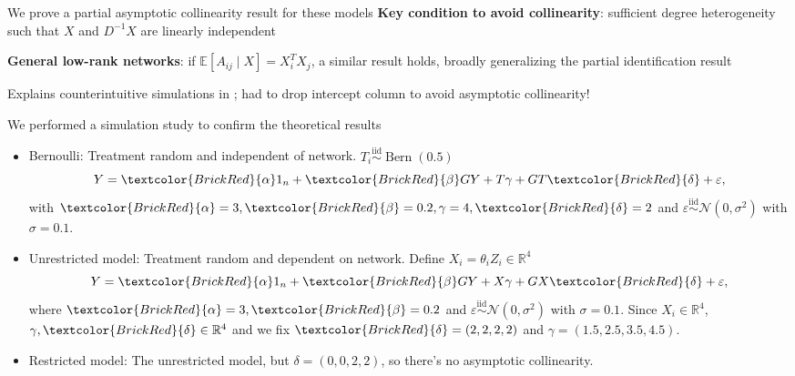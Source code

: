 \documentclass[aspectratio=169]{beamer}
\newcommand \calN {\mathcal{N}}
\newcommand{\R}{\mathbb{R}}
\newcommand{\bbE}{\mathbb{E}}
\newcommand \diid {\stackrel{\mathrm{iid}}{\sim}}
\DeclareMathOperator*{\Bern}{Bern}
\theoremstyle{remark}
\begin{document}
\begin{frame}{We prove a partial asymptotic collinearity result for these models}
    \textbf{Key condition to avoid collinearity}: sufficient degree heterogeneity such that $X$ and $D^{-1} X$ are linearly independent
    
    \vspace{4mm}
    \textbf{General low-rank networks}: if $\bbE[ A_{ij} \mid X ] = X_i^T X_j$, a similar result holds, broadly generalizing the partial identification result
    
    \vspace{4mm}
    Explains \textcolor{BrickRed}{counterintuitive} simulations in \cite{paul2022}; had to drop intercept column to avoid asymptotic collinearity!
\end{frame}

\begin{frame}{We performed a simulation study to confirm the theoretical results}
    \begin{itemize}
        \setlength\itemsep{1.75em}
        \item \textcolor{BrickRed}{Bernoulli}: Treatment random and independent of network. $T_i \diid \Bern(0.5)$
              \begin{equation*}
                  Y = \textcolor{BrickRed}{\alpha} 1_n + \textcolor{BrickRed}{\beta} G Y + T \gamma + G T \textcolor{BrickRed}{\delta} + \varepsilon,
              \end{equation*}
              with $\textcolor{BrickRed}{\alpha} = 3, \textcolor{BrickRed}{\beta} = 0.2, \gamma = 4, \textcolor{BrickRed}{\delta} = 2$ and $\varepsilon \diid \calN(0, \sigma^2)$ with $\sigma = 0.1$.
        \item \textcolor{BrickRed}{Unrestricted model}: Treatment random and dependent on network. Define $X_i = \theta_i Z_i \in \R^4$
              \begin{equation*}
                  Y = \textcolor{BrickRed}{\alpha} 1_n + \textcolor{BrickRed}{\beta} G Y + X \gamma + G X \textcolor{BrickRed}{\delta} + \varepsilon,
              \end{equation*}
              where $\textcolor{BrickRed}{\alpha} = 3, \textcolor{BrickRed}{\beta} = 0.2$ and $\varepsilon \diid \calN(0, \sigma^2)$ with $\sigma = 0.1$. Since $X_i \in \R^4$, $\gamma, \textcolor{BrickRed}{\delta} \in \R^4$ and we fix $\textcolor{BrickRed}{\delta} = (2, 2, 2, 2)$ and $\gamma = (1.5, 2.5, 3.5, 4.5)$.
        \item Restricted model: The unrestricted model, but $\delta = (0, 0, 2, 2)$, so there's no asymptotic collinearity.
    \end{itemize}
\end{frame}
\end{document}
